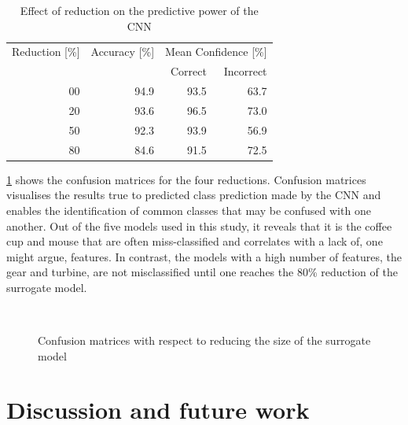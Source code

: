\documentclass[a4paper, 11pt]{article}
\begin{document}
\begin{table}[t!]
  \centering
  \caption{Effect of reduction on the predictive power of the CNN}\label{tbl:reduction}\small
  \begin{tabular}{r r r r}
    \toprule
      Reduction [\%] & Accuracy [\%] & \multicolumn{2}{c}{Mean Confidence [\%]} \\
      & & Correct & Incorrect \\
    \midrule
      00 & 94.9 & 93.5 & 63.7 \\
      20 & 93.6 & 96.5 & 73.0 \\
      50 & 92.3 & 93.9 & 56.9 \\
      80 & 84.6 & 91.5 & 72.5 \\
    \bottomrule
  \end{tabular}
\end{table}

\cref{fig:conf} shows the confusion matrices for the four reductions. Confusion matrices visualises the results true to predicted class prediction made by the CNN and enables the identification of common classes that may be confused with one another. Out of the five models used in this study, it reveals that it is the coffee cup and mouse that are often miss-classified and correlates with a lack of, one might argue, features. In contrast, the models with a high number of features, the gear and turbine, are not misclassified until one reaches the 80\% reduction of the surrogate model.

\begin{figure}[t!]

    \hfill{}
    \subfloat[0\%]{
        
    }
    \hfill{}
    \subfloat[12\%]{
        
    }
    \hfill{}
    
    \leavevmode\\
    
    \hfill{}
    \subfloat[50\%]{
        
    }
    \hfill{}
    \subfloat[80\%]{
        
    }
    \hfill{}
    
    \caption{Confusion matrices with respect to reducing the size of the surrogate model}\label{fig:conf}
\end{figure}

\section{Discussion and future work}\label{sec:dis}
\end{document}
